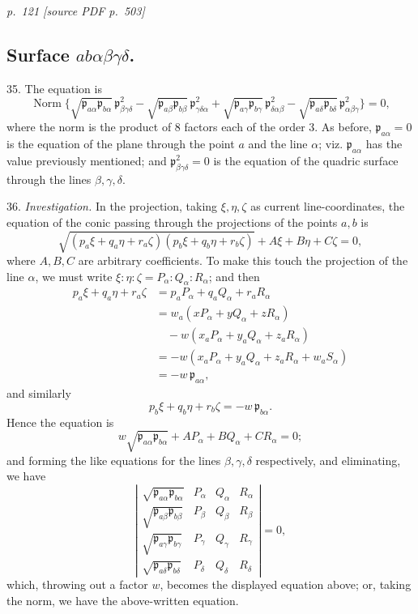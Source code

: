 \documentclass[11pt,a4paper]{article}
\newcommand{\sourcepage}[2]{%
  \bigskip
  \noindent\textit{p.~#1 [source PDF p.~#2]}%
  \par\smallskip
}
\newcommand{\p}{\mathfrak p}
\newcommand{\Norm}{\operatorname{Norm}}
\begin{document}
\sourcepage{121}{503}
\subsection*{Surface \(ab\alpha\beta\gamma\delta\).}

35. The equation is
\[
\Norm\{\sqrt{\p_{a\alpha}\p_{b\alpha}}\,\p^2_{\beta\gamma\delta}
-\sqrt{\p_{a\beta}\p_{b\beta}}\,\p^2_{\gamma\delta\alpha}
+\sqrt{\p_{a\gamma}\p_{b\gamma}}\,\p^2_{\delta\alpha\beta}
-\sqrt{\p_{a\delta}\p_{b\delta}}\,\p^2_{\alpha\beta\gamma}\}=0,
\]
where the norm is the product of 8 factors each of the order 3. As before,
$\p_{a\alpha}=0$ is the equation of the plane through the point $a$ and the line
$\alpha$; viz. $\p_{a\alpha}$ has the value previously mentioned; and
$\p^2_{\beta\gamma\delta}=0$ is the equation of the quadric surface through the
lines $\beta,\gamma,\delta$.

36. \textit{Investigation.} In the projection, taking $\xi,\eta,\zeta$ as current
line-coordinates, the equation of the conic passing through the projections of the
points $a,b$ is
\[
\sqrt{(p_a\xi+q_a\eta+r_a\zeta)(p_b\xi+q_b\eta+r_b\zeta)}
+A\xi+B\eta+C\zeta=0,
\]
where $A,B,C$ are arbitrary coefficients. To make this touch the projection of the
line $\alpha$, we must write $\xi:\eta:\zeta=P_\alpha:Q_\alpha:R_\alpha$; and then
\[
\begin{aligned}
p_a\xi+q_a\eta+r_a\zeta
&=p_aP_\alpha+q_aQ_\alpha+r_aR_\alpha\\
&=w_a(xP_\alpha+yQ_\alpha+zR_\alpha)\\
&\quad -w(x_aP_\alpha+y_aQ_\alpha+z_aR_\alpha)\\
&=-w(x_aP_\alpha+y_aQ_\alpha+z_aR_\alpha+w_aS_\alpha)\\
&=-w\,\p_{a\alpha},
\end{aligned}
\]
and similarly
\[
p_b\xi+q_b\eta+r_b\zeta=-w\,\p_{b\alpha}.
\]
Hence the equation is
\[
w\sqrt{\p_{a\alpha}\p_{b\alpha}}+AP_\alpha+BQ_\alpha+CR_\alpha=0;
\]
and forming the like equations for the lines $\beta,\gamma,\delta$ respectively, and
eliminating, we have
\[
\left|\begin{array}{cccc}
\sqrt{\p_{a\alpha}\p_{b\alpha}}&P_\alpha&Q_\alpha&R_\alpha\\
\sqrt{\p_{a\beta}\p_{b\beta}}&P_\beta&Q_\beta&R_\beta\\
\sqrt{\p_{a\gamma}\p_{b\gamma}}&P_\gamma&Q_\gamma&R_\gamma\\
\sqrt{\p_{a\delta}\p_{b\delta}}&P_\delta&Q_\delta&R_\delta
\end{array}\right|=0,
\]
which, throwing out a factor $w$, becomes the displayed equation above; or, taking
the norm, we have the above-written equation.
\end{document}
